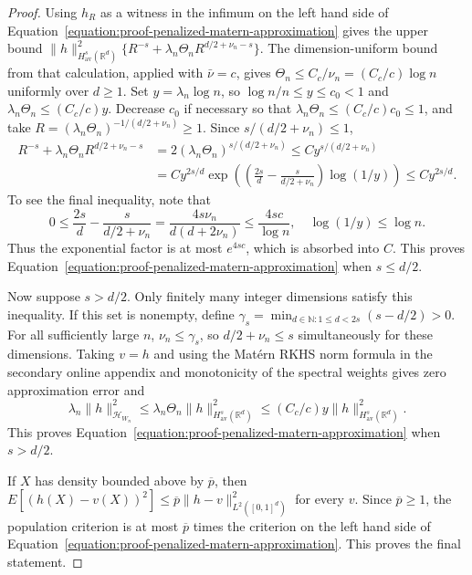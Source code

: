 \documentclass[letterpaper,12pt]{article}
\theoremstyle{definition}
\numberwithin{equation}{section}
\newcommand{\mc}{\mathcal}
\newcommand{\norm}[1]{\lVert#1\rVert}
\begin{document}
\begin{proof}
Using $h_R$ as a witness in the infimum on the left hand side of Equation~\eqref{equation:proof-penalized-matern-approximation} gives the upper bound $\norm{h}_{H_{\mathrm{av}}^s(\mathbb R^d)}^2\{R^{-s}+\lambda_n\Theta_nR^{d/2+\nu_n-s}\}$.
The dimension-uniform bound from that calculation, applied with $\bar\nu=c$, gives $\Theta_n\leq C_c/\nu_n=(C_c/c)\log n$ uniformly over $d\geq1$.
Set $y=\lambda_n\log n$, so $\log n/n\leq y\leq c_0<1$ and $\lambda_n\Theta_n\leq(C_c/c)y$.
Decrease $c_0$ if necessary so that $\lambda_n\Theta_n\leq(C_c/c)c_0\leq1$, and take $R=(\lambda_n\Theta_n)^{-1/(d/2+\nu_n)}\geq1$.
Since $s/(d/2+\nu_n)\leq1$,
\begin{align*}
R^{-s}+\lambda_n\Theta_nR^{d/2+\nu_n-s}&=2(\lambda_n\Theta_n)^{s/(d/2+\nu_n)}\leq Cy^{s/(d/2+\nu_n)}\\
&=Cy^{2s/d}\exp\left(\left(\frac{2s}{d}-\frac{s}{d/2+\nu_n}\right)\log(1/y)\right)\leq Cy^{2s/d}.
\end{align*}
To see the final inequality, note that
\begin{equation*}
0\leq\frac{2s}{d}-\frac{s}{d/2+\nu_n}=\frac{4s\nu_n}{d(d+2\nu_n)}\leq\frac{4sc}{\log n}, \quad \log(1/y)\leq\log n.
\end{equation*}
Thus the exponential factor is at most $e^{4sc}$, which is absorbed into $C$.
This proves Equation~\eqref{equation:proof-penalized-matern-approximation} when $s\leq d/2$.

Now suppose $s>d/2$.
Only finitely many integer dimensions satisfy this inequality.
If this set is nonempty, define $\gamma_s=\min_{d\in\mathbb N:1\leq d<2s}(s-d/2)>0$.
For all sufficiently large $n$, $\nu_n\leq\gamma_s$, so $d/2+\nu_n\leq s$ simultaneously for these dimensions.
Taking $v=h$ and using the Mat\'ern RKHS norm formula in the secondary online appendix and monotonicity of the spectral weights gives zero approximation error and
\begin{equation*}
\lambda_n\norm{h}_{\mc H_{W_n}}^2\leq\lambda_n\Theta_n\norm{h}_{H_{\mathrm{av}}^s(\mathbb R^d)}^2\leq(C_c/c)y\norm{h}_{H_{\mathrm{av}}^s(\mathbb R^d)}^2.
\end{equation*}
This proves Equation~\eqref{equation:proof-penalized-matern-approximation} when $s>d/2$.

If $X$ has density bounded above by $\overline p$, then $E[(h(X)-v(X))^2]\leq\overline p\norm{h-v}_{L^2([0,1]^d)}^2$ for every $v$.
Since $\overline p\geq1$, the population criterion is at most $\overline p$ times the criterion on the left hand side of Equation~\eqref{equation:proof-penalized-matern-approximation}.
This proves the final statement.
\end{proof}
\end{document}
